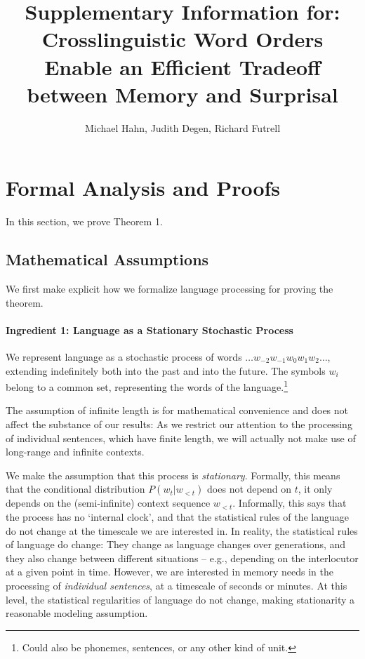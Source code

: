 \documentclass[11pt,letterpaper]{article}
\title{Supplementary Information for: Crosslinguistic Word Orders Enable an Efficient Tradeoff between Memory and Surprisal}
\author{Michael Hahn, Judith Degen, Richard Futrell}
\newcounter{theorem}
\begin{document}
\maketitle

\tableofcontents


%
%
%


\section{Formal Analysis and Proofs}

In this section, we prove Theorem 1.

\subsection{Mathematical Assumptions}

We first make explicit how we formalize language processing for proving the theorem.


\paragraph{Ingredient 1: Language as a Stationary Stochastic Process}
We represent language as a stochastic process of words $\dots w_{-2} w_{-1} w_0 w_{1} w_{2} \dots$, extending indefinitely both into the past and into the future.
The symbols $w_i$ belong to a common set, representing the words of the language.\footnote{Could also be phonemes, sentences, or any other kind of unit.}

The assumption of infinite length is for mathematical convenience and does not affect the substance of our results:
As we restrict our attention to the processing of individual sentences, which have finite length, we will actually not make use of long-range and infinite contexts.

We make the assumption that this process is \emph{stationary}.
Formally, this means that the conditional distribution $P(w_t|w_{<t})$ does not depend on $t$, it only depends on the (semi-infinite) context sequence $w_{<t}$.
Informally, this says that the process has no `internal clock', and that the statistical rules of the language do not change at the timescale we are interested in.
In reality, the statistical rules of language do change: They change as language changes over generations, and they also change between different situations -- e.g., depending on the interlocutor at a given point in time.
However, we are interested in memory needs in the processing of \emph{individual sentences}, at a timescale of seconds or minutes.
At this level, the statistical regularities of language do not change, making stationarity a reasonable modeling assumption.
\end{document}
